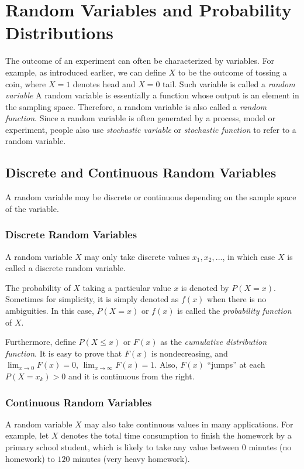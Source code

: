 \chapter{Random Variables and Probability Distributions} \label{ch:rv}

The outcome of an experiment can often be characterized by variables. For example, as introduced earlier, we can define $X$ to be the outcome of tossing a coin, where $X=1$ denotes head and $X=0$ tail. Such variable is called a \textit{random variable} A random variable is essentially a function whose output is an element in the sampling space. Therefore, a random variable is also called a \textit{random function}. Since a random variable is often generated by a process, model or experiment, people also use \textit{stochastic variable} or \textit{stochastic function} to refer to a random variable.

\section{Discrete and Continuous Random Variables}

A random variable may be discrete or continuous depending on the sample space of the variable.

\subsection{Discrete Random Variables}

A random variable $X$ may only take discrete values $x_1, x_2, ...$, in which case $X$ is called a discrete random variable.

The probability of $X$ taking a particular value $x$ is denoted by $P(X=x)$. Sometimes for simplicity, it is simply denoted as $f(x)$ when there is no ambiguities. In this case, $P(X=x)$ or $f(x)$ is called the \textit{probability function} of $X$.

Furthermore, define $P(X\leq x)$ or $F(x)$ as the \textit{cumulative distribution function}. It is easy to prove that $F(x)$ is nondecreasing, and $\lim_{x\rightarrow 0}F(x)=0$, $\lim_{x\rightarrow \infty}F(x)=1$. Also, $F(x)$ ``jumps'' at each $P(X=x_k)>0$ and it is continuous from the right.

\subsection{Continuous Random Variables}

A random variable $X$ may also take continuous values in many applications. For example, let $X$ denotes the total time consumption to finish the homework by a primary school student, which is likely to take any value between $0$ minutes (no homework) to $120$ minutes (very heavy homework).


